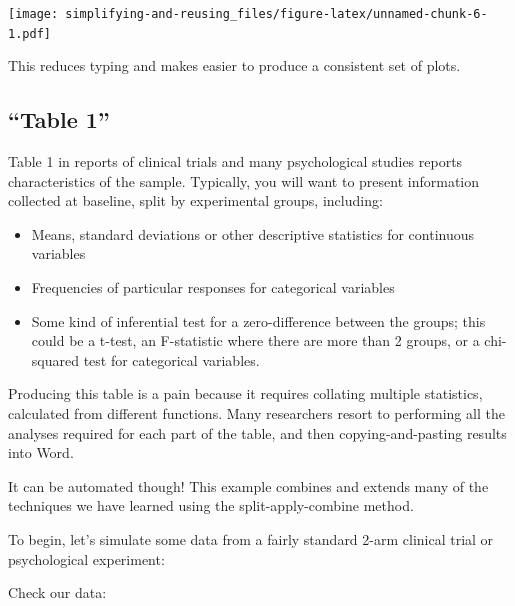 \documentclass[]{article}
\providecommand{\tightlist}{%
  \setlength{\itemsep}{0pt}\setlength{\parskip}{0pt}}
\begin{document}
\texttt{[image: simplifying-and-reusing\_files/figure-latex/unnamed-chunk-6-1.pdf]}

This reduces typing and makes easier to produce a consistent set of plots.

\hypertarget{table1}{%
\subsection*{``Table 1''}\label{table1}}

Table 1 in reports of clinical trials and many psychological studies reports
characteristics of the sample. Typically, you will want to present information
collected at baseline, split by experimental groups, including:

\begin{itemize}
\tightlist
\item
  Means, standard deviations or other descriptive statistics for continuous
  variables
\item
  Frequencies of particular responses for categorical variables
\item
  Some kind of inferential test for a zero-difference between the groups; this
  could be a t-test, an F-statistic where there are more than 2 groups, or a
  chi-squared test for categorical variables.
\end{itemize}

Producing this table is a pain because it requires collating multiple
statistics, calculated from different functions. Many researchers resort to
performing all the analyses required for each part of the table, and then
copying-and-pasting results into Word.

It can be automated though! This example combines and extends many of the
techniques we have learned using the split-apply-combine method.

To begin, let's simulate some data from a fairly standard 2-arm clinical trial
or psychological experiment:

Check our data:
\end{document}
